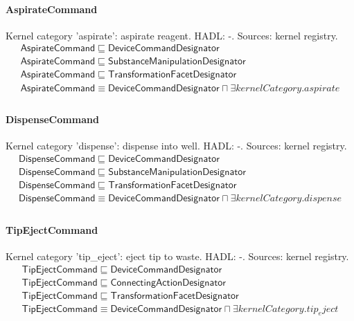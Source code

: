\documentclass[10pt]{article}
\begin{document}
\paragraph{AspirateCommand} Kernel category 'aspirate': aspirate reagent. HADL: -. Sources: kernel registry.
\[\begin{array}{l}
\mathsf{AspirateCommand} \sqsubseteq  \mathsf{DeviceCommandDesignator} \\
\mathsf{AspirateCommand} \sqsubseteq  \mathsf{SubstanceManipulationDesignator} \\
\mathsf{AspirateCommand} \sqsubseteq  \mathsf{TransformationFacetDesignator} \\
\mathsf{AspirateCommand} \equiv  \mathsf{DeviceCommandDesignator} \sqcap  \exists \mathit{kernelCategory}.{aspirate} \\
\end{array}\]
\paragraph{DispenseCommand} Kernel category 'dispense': dispense into well. HADL: -. Sources: kernel registry.
\[\begin{array}{l}
\mathsf{DispenseCommand} \sqsubseteq  \mathsf{DeviceCommandDesignator} \\
\mathsf{DispenseCommand} \sqsubseteq  \mathsf{SubstanceManipulationDesignator} \\
\mathsf{DispenseCommand} \sqsubseteq  \mathsf{TransformationFacetDesignator} \\
\mathsf{DispenseCommand} \equiv  \mathsf{DeviceCommandDesignator} \sqcap  \exists \mathit{kernelCategory}.{dispense} \\
\end{array}\]
\paragraph{TipEjectCommand} Kernel category 'tip\_eject': eject tip to waste. HADL: -. Sources: kernel registry.
\[\begin{array}{l}
\mathsf{TipEjectCommand} \sqsubseteq  \mathsf{DeviceCommandDesignator} \\
\mathsf{TipEjectCommand} \sqsubseteq  \mathsf{ConnectingActionDesignator} \\
\mathsf{TipEjectCommand} \sqsubseteq  \mathsf{TransformationFacetDesignator} \\
\mathsf{TipEjectCommand} \equiv  \mathsf{DeviceCommandDesignator} \sqcap  \exists \mathit{kernelCategory}.{tip_eject} \\
\end{array}\]
\end{document}
